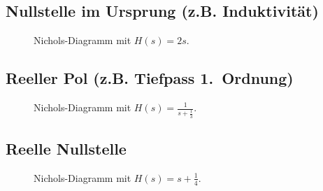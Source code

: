 {\vspace*{-5mm}\subsection{Nullstelle im Ursprung (z.B. Induktivit\"at)}
\vspace*{-5mm}
\begin{figure}[!htb]%
\vspace*{-8mm}
\begin{center}
  \vspace*{-3mm}\caption{Nichols-Diagramm mit $H(s)=2 s$.}
\end{center}
\vspace*{-6mm}
\end{figure}

\newpage
\vspace*{-6mm}\subsection{Reeller Pol (z.B. Tiefpass 1.~Ordnung)}
\vspace*{-5mm}
\begin{figure}[!htb]%
\vspace*{-5mm}
\begin{center}
  \vspace*{-3mm}\caption{Nichols-Diagramm mit $H(s)=\frac{1}{s+\frac{1}{3}}$.}
\end{center}
\vspace*{-6mm}
\end{figure}
\vspace*{-6mm}

\subsection{Reelle Nullstelle}
\vspace*{-5mm}
\begin{figure}[!htb]%
\vspace*{-5mm}
\begin{center}
  \vspace*{-3mm}\caption{Nichols-Diagramm mit $H(s)=s+\frac{1}{4}$.}
\end{center}
\vspace*{-6mm}
\end{figure}

}
